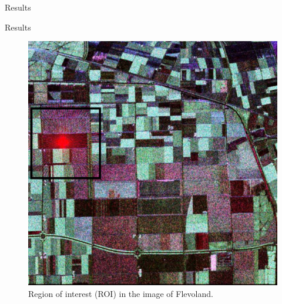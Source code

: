 \documentclass[10pt,professionalfonts]{beamer}
\begin{document}
\begin{frame}[fragile]{Results}
\begin{alertblock}{Results}
	\begin{figure}[hbt]
\centering
	\includegraphics[width=.5\linewidth]{flevoland_radial_4_look_black}
	\caption{Region of interest (ROI) in the image of Flevoland.}
\label{fig10}
\end{figure}
\end{alertblock}
\end{frame}
\end{document}
